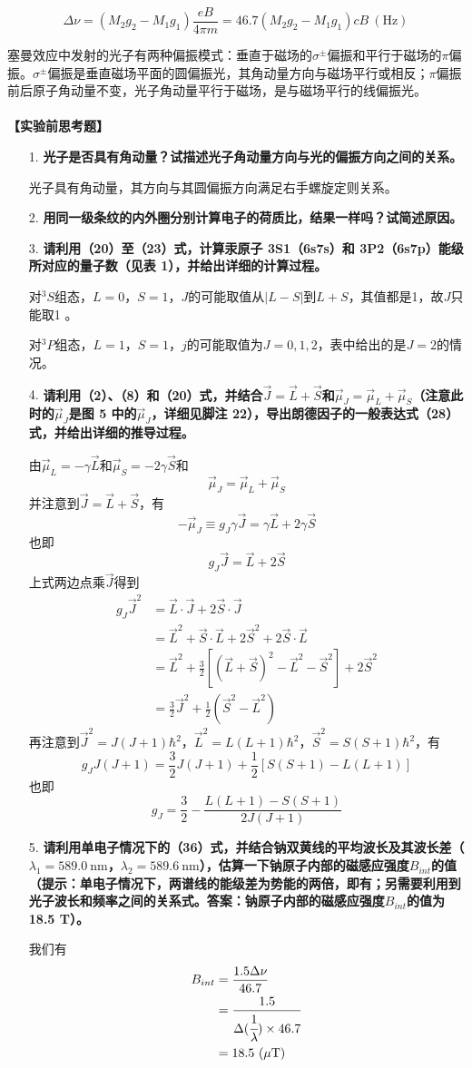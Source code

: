 \documentclass[11pt,a4paper]{ctexart}
\newcommand{\beq}{\begin{equation}}
\newcommand{\eeq}{\end{equation}}
\newcommand{\bea}{\begin{equation}\begin{aligned}}
\newcommand{\eea}{\end{aligned}\end{equation}}
\newcommand{\emptyline}{\\ \ \\}
\begin{document}
\beq
\Delta \nu = (M_2 g_2 - M_1 g_1) \frac{eB}{4 \pi m} = 46.7 (M_2 g_2 - M_1 g_1) c B \ (\mathrm{Hz})
\eeq
\par
塞曼效应中发射的光子有两种偏振模式：垂直于磁场的$\sigma^\pm$偏振和平行于磁场的$\pi$偏振。$\sigma^\pm$偏振是垂直磁场平面的圆偏振光，其角动量方向与磁场平行或相反；$\pi$偏振前后原子角动量不变，光子角动量平行于磁场，是与磁场平行的线偏振光。
\emptyline
\textbf{【实验前思考题】}
\begin{enumerate}
 \item[1.] \textbf{光子是否具有角动量？试描述光子角动量方向与光的偏振方向之间的关系。}\par
光子具有角动量，其方向与其圆偏振方向满足右手螺旋定则关系。
 \item[2.] \textbf{用同一级条纹的内外圈分别计算电子的荷质比，结果一样吗？试简述原因。}\par
 \item[3.] \textbf{请利用（20）至（23）式，计算汞原子 3S1（6s7s）和 3P2（6s7p）能级所对应的量子数（见表 1），并给出详细的计算过程。}\par
对$^3S$组态，$L = 0$，$S=1$，$J$的可能取值从$|L-S|$到$L + S$，其值都是1，故$J$只能取1  。\par
对$^3P$组态，$L = 1$，$S = 1$，$j$的可能取值为$J = 0,1,2$，表中给出的是$J = 2$的情况。
 \item[4.] \textbf{请利用（2）、（8）和（20）式，并结合$\vec{J} = \vec{L} + \vec{S}$和$\vec{\mu}_J = \vec{\mu}_L + \vec{\mu}_S$（注意此时的$\vec{\mu}_J$是图 5 中的$\vec{\mu}_J$，详细见脚注 22），导出朗德因子的一般表达式（28）式，并给出详细的推导过程。}\par
由$\vec{\mu}_L = -\gamma \vec{L}$和$\vec{\mu}_S = -2\gamma \vec{S}$和
\beq
\vec{\mu}_J = \vec{\mu}_L +\vec{\mu}_S
\eeq
并注意到$\vec{J} = \vec{L} + \vec{S}$，有
\beq
-\vec{\mu}_J \equiv g_J \gamma \vec{J} = \gamma \vec{L} + 2\gamma \vec{S}
\eeq
也即
\beq
g_J \vec{J} = \vec{L} + 2\vec{S}
\eeq
上式两边点乘$\vec{J}$得到
\bea
g_J \vec{J}^2 &= \vec{L} \cdot \vec{J} + 2\vec{S} \cdot \vec{J} \\
&= \vec{L}^2 + \vec{S}\cdot \vec{L}  + 2\vec{S}^2 + 2\vec{S} \cdot \vec{L} \\
&= \vec{L}^2 + \frac{3}{2} [(\vec{L} + \vec{S})^2 - \vec{L}^2 - \vec{S}^2] + 2\vec{S}^2 \\
&= \frac{3}{2} \vec{J}^2 + \frac{1}{2}(\vec{S}^2 - \vec{L}^2) 
\eea
再注意到$\vec{J}^2 = J(J+1)\hbar^2$，$\vec{L}^2 = L(L+1)\hbar^2$，$\vec{S}^2 = S(S+1)\hbar^2$，有
\beq
g_J J(J+1) = \frac{3}{2} J(J+1) + \frac{1}{2}[S(S+1)- L(L+1)]
\eeq
也即
\beq
g_J = \frac{3}{2} - \frac{L(L+1) - S(S+1)}{2J(J+1)}
\eeq
\item[5.] \textbf{请利用单电子情况下的（36）式，并结合钠双黄线的平均波长及其波长差（$\lambda_1 = 589.0 \mathrm{\ nm}$，$\lambda_2 = 589.6 \mathrm{\ nm}$），估算一下钠原子内部的磁感应强度$B_{int}$的值（提示：单电子情况下，两谱线的能级差为势能的两倍，即有；另需要利用到光子波长和频率之间的关系式。答案：钠原子内部的磁感应强度$B_{int}$的值为18.5 T）。}\par
我们有
\bea
B_{int} &= \frac{1.5\Delta \nu}{46.7} \\
&= \frac{1.5}{\Delta (\cfrac{1}{\lambda}) \times 46.7} \\
& = 18.5\mathrm{\ (\mu T)}
\eea


\end{enumerate}
\end{document}
